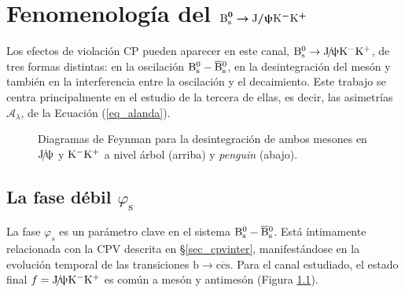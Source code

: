 \chapter[Fenomenología del $\Bs \rightarrow \Jpsi(\muon\antimuon) \kaon\antikaon$]{Fenomenología del $\bm{\text{B}_{\text{s}}^0 \rightarrow \text{J}/\uppsi \text{K}{}^{-} \text{K}{}^{+}}$}
\label{cha:pheno}




Los efectos de violación CP pueden aparecer en este canal, \color{vero}$\text{B}{}_{\text{s}}^{0} \rightarrow \text{J}\!/\!\uppsi \text{K}{}^{-} \text{K}{}^{+}$, \color{norm}   de tres formas distintas: en la oscilación $\text{B}{}_{\text{s}}^{0} - \overline{\text{B}}{}_{\text{s}}^{0}$, en la desintegración del mesón y también en la interferencia entre la oscilación y el decaimiento. Este trabajo se centra principalmente en el estudio de la tercera de ellas, es decir, las asimetrías $\mathscr{A}_{\lambda}$, de la Ecuación (\ref{eq_alanda}).



\begin{figure}[H]
\centering
{} \hfill
{} \hfill
%
 \hfill
{} \hfill
\caption{Diagramas de Feynman para la desintegración de ambos mesones en $\protect\text{J}\!/\!\uppsi$ y $\text{K}{}^{-}\text{K}{}^{+}$ a nivel árbol (arriba) y \emph{penguin} (abajo).} \label{fig_decay}
\end{figure}



\section{La fase débil ${\varphi}_{\text{s}}$} %
\label{sec_phis}

La fase $\varphi_s$ es un parámetro clave en el sistema $\text{B}{}_{\text{s}}^{0} - \overline{\text{B}}{}_{\text{s}}^{0}$. Está íntimamente relacionada con la CPV descrita en \S \ref{sec_cpvinter}, manifestándose  en la evolución temporal de las transiciones $\mathrm{b \rightarrow c \overline{c}{s}}$. Para el canal estudiado, el estado final $f=\text{J}\!/\!\uppsi \text{K}{}^{-} \text{K}{}^{+}$ es común a mesón y antimesón (Figura \ref{fig_decay}). 

